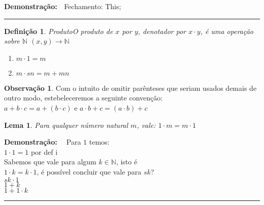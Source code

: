 \documentclass[
	12pt,				%
	oneside,			%
	a4paper,			%
	english,			%
	french,				%
	spanish,			%
	brazil,				%
	]{abntex2}
\newcommand{\N}{\ensuremath {\mathbb{N}} }
\theoremstyle{plain}
\newtheorem{lema}{Lema}[chapter]
\newtheorem{defi}{Definição}[chapter]
\theoremstyle{definition}
\newtheorem{obs}{Observação}[chapter]
\newenvironment{dem}[1][\textbf{Demonstração:} \ ]{\textbf{#1}}{\hfill\rule{2mm}{2mm}}
\begin{document}
\begin{dem}{Fechamento:}
    This;
\end{dem}

\begin{defi}{Produto}\label{def-produto-N}
	O produto de $x$ por $y$, denotador por $x \cdot y$, é uma operação sobre \N $ (x,y) \rightarrow \N$ 
	\begin{enumerate}[label=(\roman*)]
		\item $m \cdot 1 = m$
		\item $m \cdot sn = m + mn$
	\end{enumerate}
\end{defi}
\begin{obs}
	Com o intuito de omitir parênteses que seriam usados demais de outro modo, estebeleceremos a seguinte convenção: \\
	$a + b \cdot c = a + (b \cdot c)$ e $a \cdot b + c = (a \cdot b) + c$
\end{obs}

\begin{lema}
	Para qualquer número natural $m$, vale: $1 \cdot m = m \cdot 1$
\end{lema}
\begin{dem}
		Para $1$ temos: \\
		$1 \cdot 1 = 1$ por def i\\
		Sabemos que vale para algum $k \in \N$, isto é \\
		$1 \cdot k = k \cdot 1$, é possível concluir que vale para $sk$? \\
		$sk \cdot 1$ \\
		$1 + k$ \\
		$1 + 1 \cdot k$ 
\end{dem}

\end{document}
